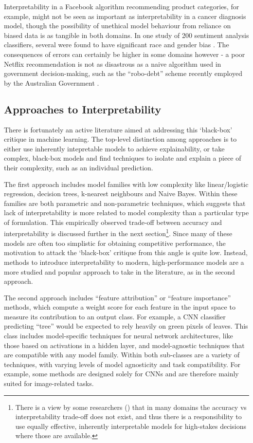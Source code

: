\documentclass[main]{subfiles}
\begin{document}
Interpretability in a Facebook algorithm recommending product categories, for example, might not be seen as important as interpretability in a cancer diagnosis model, though the possibility of unethical model behaviour from reliance on biased data is as tangible in both domains. In one study of 200 sentiment analysis classifiers, several were found to have significant race and gender bias \cite{bias}. The consequences of errors can certainly be higher in some domains however - a poor Netflix recommendation is not as disastrous as a naive algorithm used in government decision-making, such as the ``robo-debt'' scheme recently employed by the Australian Government \cite{nous}.

\subsection*{Approaches to Interpretability}

There is fortunately an active literature aimed at addressing this `black-box' critique in machine learning. The top-level distinction among approaches is to either use inherently intepretable models to achieve explainability, or take complex, black-box models and find techniques to isolate and explain a piece of their complexity, such as an individual prediction.

The first approach includes model families with low complexity like linear/logistic regression, decision trees, k-nearest neighbours and Naive Bayes. Within these families are both parametric and non-parametric techniques, which suggests that lack of interpretability is more related to model complexity than a particular type of formulation. This empirically observed trade-off between accuracy and interpretability is discussed further in the next section\footnote{There is a view by some researchers (\cite{rudin}) that in many domains the accuracy vs interpretability trade-off does not exist, and thus there is a responsibility to use equally effective, inherently interpretable models for high-stakes decisions where those are available.}. Since many of these models are often too simplistic for obtaining competitive performance, the motivation to attack the `black-box' critique from this angle is quite low. Instead, methods to introduce interpretability to modern, high-performance models are a more studied and popular approach to take in the literature, as in the second approach.

The second approach includes ``feature attribution'' or ``feature importance'' methods, which compute a weight score for each feature in the input space to measure its contribution to an output class. For example, a CNN classifier predicting ``tree'' would be expected to rely heavily on green pixels of leaves. This class includes model-specific techniques for neural network architectures, like those based on activations in a hidden layer, and model-agnostic techniques that are compatible with any model family. Within both sub-classes are a variety of techniques, with varying levels of model agnosticity and task compatibility. For example, some methods are designed solely for CNNs and are therefore mainly suited for image-related tasks. 
\end{document}
